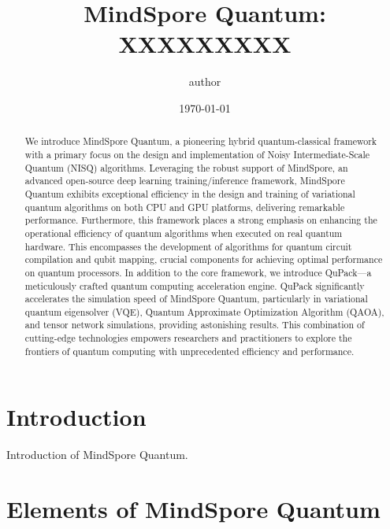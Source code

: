 \documentclass[pra,twocolumn,superscriptaddress,floatfix,nofootinbib,amsmath,amssymb]{revtex4-1}
\begin{document}
\title{MindSpore Quantum: XXXXXXXXX
}



\author{author}


\date{\today}



\begin{abstract}
    We introduce MindSpore Quantum, a pioneering hybrid quantum-classical framework with a primary focus on the design and implementation of Noisy Intermediate-Scale Quantum (NISQ) algorithms. Leveraging the robust support of MindSpore, an advanced open-source deep learning training/inference framework, MindSpore Quantum exhibits exceptional efficiency in the design and training of variational quantum algorithms on both CPU and GPU platforms, delivering remarkable performance. Furthermore, this framework places a strong emphasis on enhancing the operational efficiency of quantum algorithms when executed on real quantum hardware. This encompasses the development of algorithms for quantum circuit compilation and qubit mapping, crucial components for achieving optimal performance on quantum processors. In addition to the core framework, we introduce QuPack—a meticulously crafted quantum computing acceleration engine. QuPack significantly accelerates the simulation speed of MindSpore Quantum, particularly in variational quantum eigensolver (VQE), Quantum Approximate Optimization Algorithm (QAOA), and tensor network simulations, providing astonishing results. This combination of cutting-edge technologies empowers researchers and practitioners to explore the frontiers of quantum computing with unprecedented efficiency and performance.
\end{abstract}
\maketitle
\tableofcontents

\section{Introduction}
Introduction of MindSpore Quantum.


\section{Elements of MindSpore Quantum}
\end{document}
